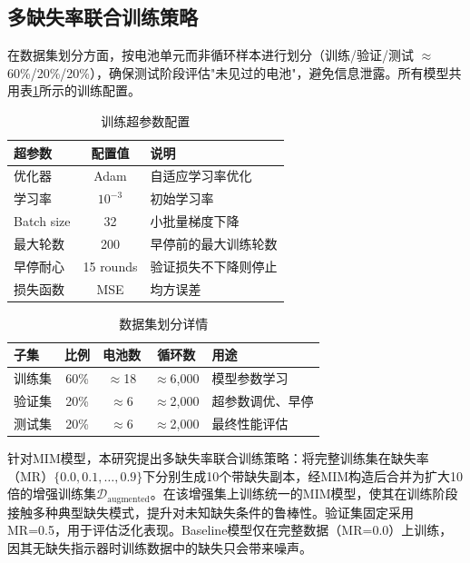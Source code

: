 \documentclass[10pt,a4paper]{ctexart}
\begin{document}
\subsection{多缺失率联合训练策略}

在数据集划分方面，按电池单元而非循环样本进行划分（训练/验证/测试 $\approx$ 60\%/20\%/20\%），确保测试阶段评估"未见过的电池"，避免信息泄露。所有模型共用表\ref{tab:training_config}所示的训练配置。

\begin{table}[H]
\centering
\caption{训练超参数配置}
\label{tab:training_config}
\begin{tabular}{@{}lcl@{}}
\toprule
\textbf{超参数} & \textbf{配置值} & \textbf{说明} \\
\midrule
优化器 & Adam & 自适应学习率优化 \\
学习率 & $10^{-3}$ & 初始学习率 \\
Batch size & 32 & 小批量梯度下降 \\
最大轮数 & 200 & 早停前的最大训练轮数 \\
早停耐心 & 15 rounds & 验证损失不下降则停止 \\
损失函数 & MSE & 均方误差 \\
\bottomrule
\end{tabular}
\end{table}

\begin{table}[H]
\centering
\caption{数据集划分详情}
\label{tab:data_split}
\begin{tabular}{@{}lcccp{5cm}@{}}
\toprule
\textbf{子集} & \textbf{比例} & \textbf{电池数} & \textbf{循环数} & \textbf{用途} \\
\midrule
训练集 & 60\% & $\approx$18 & $\approx$6,000 & 模型参数学习 \\
验证集 & 20\% & $\approx$6 & $\approx$2,000 & 超参数调优、早停 \\
测试集 & 20\% & $\approx$6 & $\approx$2,000 & 最终性能评估 \\
\bottomrule
\end{tabular}
\end{table}

针对MIM模型，本研究提出多缺失率联合训练策略：将完整训练集在缺失率（MR）$\{0.0, 0.1, \ldots, 0.9\}$下分别生成10个带缺失副本，经MIM构造后合并为扩大10倍的增强训练集$\mathcal{D}_{\text{augmented}}$。在该增强集上训练统一的MIM模型，使其在训练阶段接触多种典型缺失模式，提升对未知缺失条件的鲁棒性。验证集固定采用MR=0.5，用于评估泛化表现。Baseline模型仅在完整数据（MR=0.0）上训练，因其无缺失指示器时训练数据中的缺失只会带来噪声。
\end{document}
